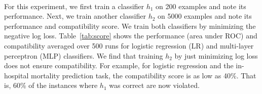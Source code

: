 \documentclass[letterpaper]{article} %
\newcommand{\bug}
    {\mbox{\rule{2mm}{2mm}}}
\newcommand{\Bug}[1]
    {\bug \footnote{BUG: {#1}}}
\newcommand{\?}{\mbox{?}}
\newcommand{\hone}{\mbox{$h_1$}}
\newcommand{\htwo}{\mbox{$h_2$}}
\begin{document}
\\
\noindent For this experiment, we first train a classifier $\hone$ on 200 examples and note its performance. Next, we train another classifier $\htwo$ on 5000 examples
and note its performance and compatibility score. We train both classifiers by minimizing the negative log loss. Table~\ref{tab:score} shows the performance (area under ROC) and compatibility averaged over 500 runs for logistic regression (LR) and multi-layer perceptron (MLP) classifiers. We find that training $\htwo$ by just minimizing log loss does not ensure compatibility. For example, for logistic regression and the in-hospital mortality prediction task, the compatibility score is as low as 40\%.  That is, 60\% of the instances where $h_1$ was correct are now violated.\\


\end{document}
